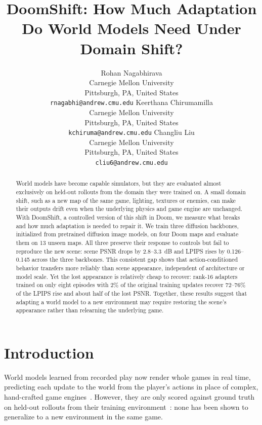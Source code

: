 \documentclass{article}
\title{DoomShift: How Much Adaptation Do World Models Need Under Domain Shift?}
\author{
  Rohan Nagabhirava\\
  Carnegie Mellon University\\
  Pittsburgh, PA, United States\\
  \texttt{rnagabhi@andrew.cmu.edu}
  \And
  Keerthana Chirumamilla\\
  Carnegie Mellon University\\
  Pittsburgh, PA, United States\\
  \texttt{kchiruma@andrew.cmu.edu}
  \And
  Changliu Liu\\
  Carnegie Mellon University\\
  Pittsburgh, PA, United States\\
  \texttt{cliu6@andrew.cmu.edu}
}
\begin{document}
\maketitle


\begin{abstract}
World models have become capable simulators, but they are evaluated almost exclusively on held-out rollouts from the domain they were trained on.
A small domain shift, such as a new map of the same game, lighting, textures or enemies, can make their outputs drift even when the underlying physics and game engine are unchanged.
With DoomShift, a controlled version of this shift in Doom, we measure what breaks and how much adaptation is needed to repair it.
We train three diffusion backbones, initialized from pretrained diffusion image models, on four Doom maps and evaluate them on 13 unseen maps.
All three preserve their response to controls but fail to reproduce the new scene: scene PSNR drops by 2.8--3.3~dB and LPIPS rises by 0.126--0.145 across the three backbones.
This consistent gap shows that action-conditioned behavior transfers more reliably than scene appearance, independent of architecture or model scale.
Yet the lost appearance is relatively cheap to recover: rank-16 adapters trained on only eight episodes with 2\% of the original training updates recover 72--76\% of the LPIPS rise and about half of the lost PSNR.
Together, these results suggest that adapting a world model to a new environment may require restoring the scene's appearance rather than relearning the underlying game.
\end{abstract}



\section{Introduction}
\label{sec:intro}

World models learned from recorded play now render whole games in real time, predicting each update to the world from the player's actions in place of complex, hand-crafted game engines~\citep{valevski2024gamengen,alonso2024diamond,he2025matrixgame2}.
However, they are only scored against ground truth on held-out rollouts from their training environment~\citep{valevski2024gamengen,alonso2024diamond,po2026multigen}: none has been shown to generalize to a new environment in the same game.
\end{document}
